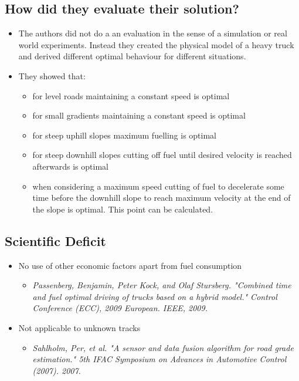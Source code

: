 \documentclass[paper=a4, fontsize=11pt]{scrartcl} %
\numberwithin{equation}{section} %
\numberwithin{figure}{section} %
\numberwithin{table}{section} %
\begin{document}
\subsection{How did they evaluate their solution?}
\begin{itemize}
	\item The authors did not do a an evaluation in the sense of a simulation or real world experiments. Instead they created the physical model of a heavy truck and derived different optimal behaviour for different situations.
	\item They showed that:
	\begin{itemize}
		\item for level roads maintaining a constant speed is optimal
		\item for small gradients maintaining a constant speed is optimal	
		\item for steep uphill slopes maximum fuelling is optimal
		\item for steep downhill slopes cutting off fuel until desired velocity is reached afterwards is optimal
		\item when considering a maximum speed cutting of fuel to decelerate some time before the downhill slope to reach maximum velocity at the end of the slope is optimal. This point can be calculated.
	\end{itemize}	 
	
\end{itemize}

\subsection{Scientific Deficit}
\begin{itemize}
	\item No use of other economic factors apart from fuel consumption\\
	\begin{itemize}
		\item \textit{Passenberg, Benjamin, Peter Kock, and Olaf Stursberg. "Combined time and fuel optimal driving of trucks based on a hybrid model." Control Conference (ECC), 2009 European. IEEE, 2009.}
	\end{itemize}
	
	\item Not applicable to unknown tracks
	\begin{itemize}
		\item \textit{Sahlholm, Per, et al. "A sensor and data fusion algorithm for road grade estimation." 5th IFAC Symposium on Advances in Automotive Control (2007). 2007.}
	\end{itemize}
\end{itemize}
\end{document}
